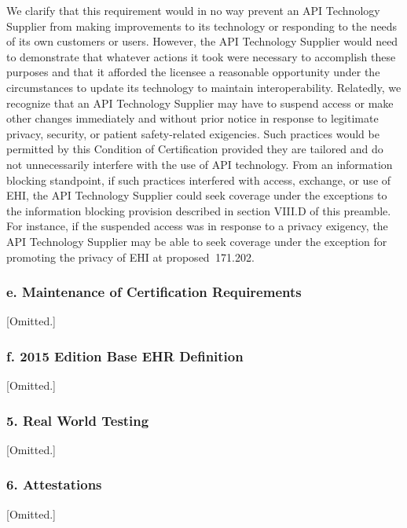 \documentclass[twoside,11pt]{article}
\begin{document}
          We clarify that this requirement would in no way prevent an API Technology Supplier from making improvements to its technology or responding to the needs of its own customers or users. However, the API Technology Supplier would need to demonstrate that whatever actions it took were necessary to accomplish these purposes and that it afforded the licensee a reasonable opportunity under the circumstances to update its technology to maintain interoperability. Relatedly, we recognize that an API Technology Supplier may have to suspend access or make other changes immediately and without prior notice in response to legitimate privacy, security, or patient safety-related exigencies. Such practices would be permitted by this Condition of Certification provided they are tailored and do not unnecessarily interfere with the use of API technology. From an information blocking standpoint, if such practices interfered with access, exchange, or use of EHI, the API Technology Supplier could seek coverage under the exceptions to the information blocking provision described in section VIII.D of this preamble. For instance, if the suspended access was in response to a privacy exigency, the API Technology Supplier may be able to seek coverage under the exception for promoting the privacy of EHI at proposed \textsection{} 171.202.


          \subsubsection{e. Maintenance of Certification Requirements}

[Omitted.]

          \subsubsection{f. 2015 Edition Base EHR Definition}

[Omitted.]

          \subsubsection{5. Real World Testing}

[Omitted.]

          \subsubsection{6. Attestations}

[Omitted.]
\end{document}
